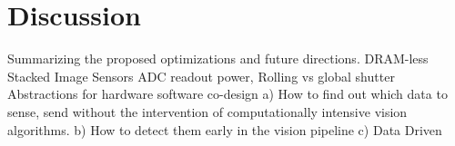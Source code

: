 \chapter{Discussion}
Summarizing the proposed optimizations and future directions.
DRAM-less
Stacked Image Sensors
ADC readout power, Rolling vs global shutter
Abstractions for hardware software co-design
a) How to find out which data to sense, send without the intervention of computationally intensive vision algorithms.
b) How to detect them early in the vision pipeline
c) Data Driven 



	

